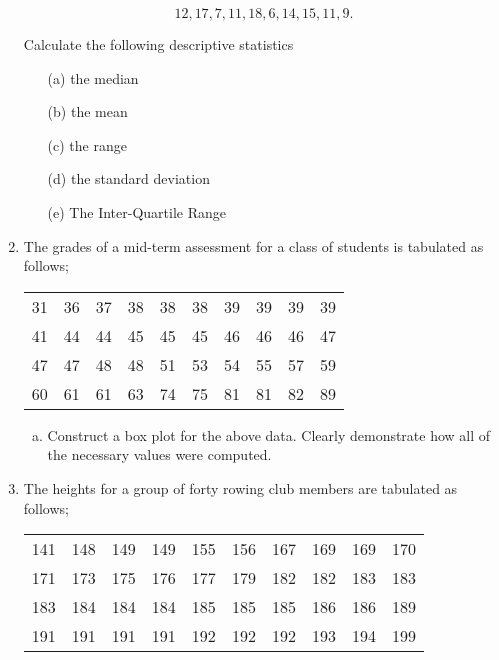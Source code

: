 \documentclass[a4paper,12pt]{article}
\begin{document}
\begin{enumerate}
	\[12, 17, 7, 11, 18, 6, 14, 15, 11, 9.\]
	
	Calculate the following descriptive statistics

	\begin{itemize}   
		\item[(a)] the median    
		\item[(b)] the mean     
		\item[(c)] the range    
		\item[(d)] the standard deviation 
		\item[(e)] The Inter-Quartile Range
	\end{itemize}

	
\item 
The grades of a mid-term assessment for a class of students is tabulated as follows;
\begin{table}[ht]
\begin{center}
\begin{tabular}{|rrrrrrrrrr|}
\hline
31 & 36 & 37 & 38 & 38 & 38 & 39 & 39 & 39 & 39 \\
41 & 44 & 44 & 45 & 45 & 45 & 46 & 46 & 46 & 47 \\
47 & 47 & 48 & 48 & 51 & 53 & 54 & 55 & 57 & 59 \\
60 & 61 & 61 & 63 & 74 & 75 & 81 & 81 & 82 & 89 \\
\hline
\end{tabular}
\end{center}
\end{table}
\begin{enumerate}[(a)]
\item Construct a box plot for the above data. Clearly demonstrate how all of the necessary values were computed.
\end{enumerate}
\item 
The heights for a group of forty rowing club members are tabulated as follows;
\begin{table}[ht]
\begin{center}
\begin{tabular}{|rrrrrrrrrr|}
\hline
141 & 148 & 149 & 149 & 155 & 156 & 167 & 169 & 169 & 170 \\
171 & 173 & 175 & 176 & 177 & 179 & 182 & 182 & 183 & 183 \\
183 & 184 & 184 & 184 & 185 & 185 & 185 & 186 & 186 & 189 \\
191 & 191 & 191 & 191 & 192 & 192 & 192 & 193 & 194 & 199 \\
\hline
\end{tabular}
\end{center}
\end{table}
\begin{enumerate}[(a)]


\end{enumerate}
\end{enumerate}
\end{document}
